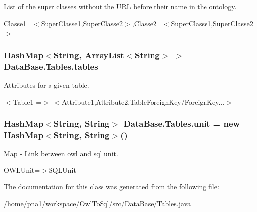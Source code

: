 List of the super classes without the URL before their name in the ontology. 

Classe1=$<$SuperClasse1,SuperClasse2$>$,Classe2=$<$SuperClasse1,SuperClasse2$>$ \hypertarget{class_data_base_1_1_tables_ae6cd882f76e6474bd85b97b5013437ca}{
\subsubsection[{tables}]{\setlength{\rightskip}{0pt plus 5cm}HashMap$<$String, ArrayList$<$String$>$ $>$ {\bf DataBase.Tables.tables}}}
\label{class_data_base_1_1_tables_ae6cd882f76e6474bd85b97b5013437ca}


Attributes for a given table. 

$<$Table1 =$>$ $<$Attribute1,Attribute2,TableForeignKey/ForeignKey...$>$ \hypertarget{class_data_base_1_1_tables_a5f222e493ed4508b40f5fd8e50becaae}{
\subsubsection[{unit}]{\setlength{\rightskip}{0pt plus 5cm}HashMap$<$String, String$>$ {\bf DataBase.Tables.unit} = new HashMap$<$String, String$>$()}}
\label{class_data_base_1_1_tables_a5f222e493ed4508b40f5fd8e50becaae}


Map -\/ Link between owl and sql unit. 

OWLUnit=$>$SQLUnit 

The documentation for this class was generated from the following file:\begin{DoxyCompactItemize}
\item 
/home/pna1/workspace/OwlToSql/src/DataBase/\hyperlink{_tables_8java}{Tables.java}\end{DoxyCompactItemize}
